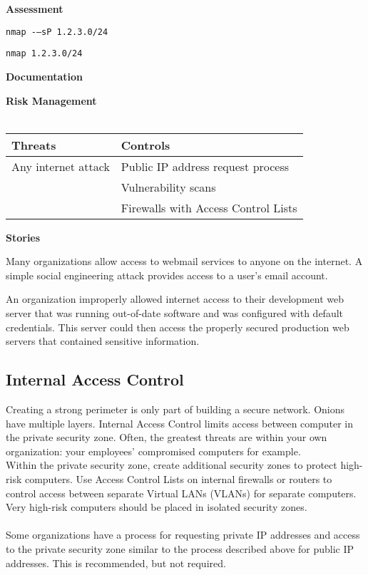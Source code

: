 \textbf{Assessment}
\begin{description}
\begin{verbatim}nmap -–sP 1.2.3.0/24\end{verbatim}
\begin{verbatim}nmap 1.2.3.0/24\end{verbatim}
\end{description}
\textbf{Documentation}
\begin{description}
\end{description}
\textbf{Risk Management}\\\\
\begin{tabularx}{\textwidth}{ X | X }
Threats & Controls \\
\hline
Any internet attack & Public IP address request process \\ & Vulnerability scans\\ & Firewalls with Access Control Lists
\end{tabularx}\vspace{5mm}
\textbf{Stories}
\begin{description}
\item Many organizations allow access to webmail services to anyone on the internet. A simple social engineering attack provides access to a user's email account.
\item An organization improperly allowed internet access to their development web server that was running out-of-date software and was configured with default credentials. This server could then access the properly secured production web servers that contained sensitive information.
\end{description}
\subsection{Internal Access Control}
Creating a strong perimeter is only part of building a secure network. Onions have multiple layers. Internal Access Control limits access between computer in the private security zone. Often, the greatest threats are within your own organization: your employees' compromised computers for example.\\
Within the private security zone, create additional security zones to protect high-risk computers. Use Access Control Lists on internal firewalls or routers to control access between separate Virtual LANs (VLANs) for separate computers. Very high-risk computers should be placed in isolated security zones.\\\\
Some organizations have a process for requesting private IP addresses and access to the private security zone similar to the process described above for public IP addresses. This is recommended, but not required.
